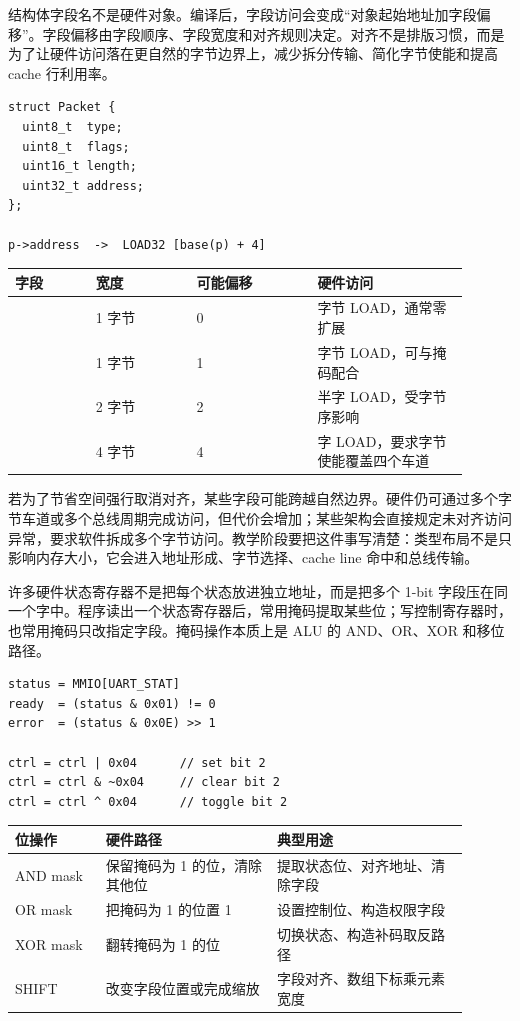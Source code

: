 结构体字段名不是硬件对象。编译后，字段访问会变成“对象起始地址加字段偏移”。字段偏移由字段顺序、字段宽度和对齐规则决定。对齐不是排版习惯，而是为了让硬件访问落在更自然的字节边界上，减少拆分传输、简化字节使能和提高 cache 行利用率。

\begin{lstlisting}
struct Packet {
  uint8_t  type;
  uint8_t  flags;
  uint16_t length;
  uint32_t address;
};

p->address  ->  LOAD32 [base(p) + 4]
\end{lstlisting}

\begin{longtable}{L{0.16\linewidth}L{0.2\linewidth}L{0.24\linewidth}L{0.3\linewidth}}
\toprule
字段 & 宽度 & 可能偏移 & 硬件访问 \\
\midrule
{} & 1 字节 & 0 & 字节 LOAD，通常零扩展 \\
 & 1 字节 & 1 & 字节 LOAD，可与掩码配合 \\
 & 2 字节 & 2 & 半字 LOAD，受字节序影响 \\
 & 4 字节 & 4 & 字 LOAD，要求字节使能覆盖四个车道 \\
\bottomrule
\end{longtable}

若为了节省空间强行取消对齐，某些字段可能跨越自然边界。硬件仍可通过多个字节车道或多个总线周期完成访问，但代价会增加；某些架构会直接规定未对齐访问异常，要求软件拆成多个字节访问。教学阶段要把这件事写清楚：类型布局不是只影响内存大小，它会进入地址形成、字节选择、cache line 命中和总线传输。

许多硬件状态寄存器不是把每个状态放进独立地址，而是把多个 1-bit 字段压在同一个字中。程序读出一个状态寄存器后，常用掩码提取某些位；写控制寄存器时，也常用掩码只改指定字段。掩码操作本质上是 ALU 的 AND、OR、XOR 和移位路径。

\begin{lstlisting}
status = MMIO[UART_STAT]
ready  = (status & 0x01) != 0
error  = (status & 0x0E) >> 1

ctrl = ctrl | 0x04      // set bit 2
ctrl = ctrl & ~0x04     // clear bit 2
ctrl = ctrl ^ 0x04      // toggle bit 2
\end{lstlisting}

\begin{longtable}{L{0.18\linewidth}L{0.34\linewidth}L{0.38\linewidth}}
\toprule
位操作 & 硬件路径 & 典型用途 \\
\midrule
AND mask & 保留掩码为 1 的位，清除其他位 & 提取状态位、对齐地址、清除字段 \\
OR mask & 把掩码为 1 的位置 1 & 设置控制位、构造权限字段 \\
XOR mask & 翻转掩码为 1 的位 & 切换状态、构造补码取反路径 \\
SHIFT & 改变字段位置或完成缩放 & 字段对齐、数组下标乘元素宽度 \\
\bottomrule
\end{longtable}

